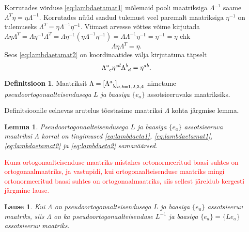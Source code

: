 \documentclass[a4paper,12pt]{article}
\theoremstyle{plain}
\newtheorem{lemma}{Lemma}[section]
\newtheorem{lause}{Lause}[section]
\theoremstyle{definition}
\newtheorem{definitsioon}{Definitsioon}[section]
\numberwithin{equation}{section}
\begin{document}
Korrutades võrduse \ref{eq:lambdaetamat1} mõlemaid pooli maatriksiga $\Lambda^{-1}$ saame $\Lambda^T \eta = \eta \Lambda^{-1}$. Korrutades nüüd saadud tulemust veel paremalt maatriksiga $\eta^{-1}$ on tulemuseks $\Lambda^T = \eta \Lambda^{-1} \eta^{-1}$. Viimast arvesse võttes võime kirjutada $\Lambda \eta \Lambda^T = \Lambda \eta^{-1} \Lambda^T = \Lambda \eta^{-1} \left( \eta \Lambda^{-1} \eta^{-1} \right) = \Lambda \Lambda^{-1} \eta^{-1} = \eta^{-1} = \eta$ ehk
\begin{equation} \label{eq:lambdaetamat2}
\Lambda \eta \Lambda^T = \eta.
\end{equation}
Seos \ref{eq:lambdaetamat2} on koordinaatides välja kirjutatuna täpselt
\begin{equation} \label{eq:lambdaeta2}
\Lambda\indices{^a_c} \eta^{cd} \Lambda\indices{^b_d} = \eta^{ab}.
\end{equation}
\begin{definitsioon}
Maatriksit $\Lambda = \left[\Lambda\indices{^a_b} \right]_{a,b=1,2,3,4}$ nimetame \emph{pseudoortogonaalteisendusega $L$ ja baasiga $\{e_a\}$} assotsieeruvaks maatriksiks.
\end{definitsioon}
Definitsioonile eelnevas arutelus tõestasime maatriksi $\Lambda$ kohta järgmise lemma.
\begin{lemma} \label{lemma:lambdainvariant}
Pseudoortogonaalteisendusega $L$ ja baasiga $\{e_a\}$ assotsieeruva maatriksi $\Lambda$ korral on tingimused \ref{eq:lambdaeta1}, \ref{eq:lambdaetamat1}, \ref{eq:lambdaetamat2} ja \ref{eq:lambdaeta2} samaväärsed.
\end{lemma}

\textcolor{red}{
Kuna ortogonaalteisenduse maatriks mistahes ortonormeeritud baasi suhtes on ortogonaalmaatriks, ja vastupidi, kui ortogonaalteisenduse maatriks mingi ortonormeeritud baasi suhtes on ortogonaalmaatriks, siis sellest järeldub kergesti järgmine lause.
}
\begin{lause}\textnormal{\cite[lk 271]{Kilp}}
Kui $\Lambda$ on pseudoortogonaalteisendusega $L$ ja baasiga $\{e_a\}$ assotsieeruv maatriks, siis $\Lambda$ on ka pseudoortogonaalteisenduse $L^{-1}$ ja baasiga $\{\hat{e}_a\} = \{Le_a\}$ assotsieeruv maatriks.
\end{lause}
\end{document}
